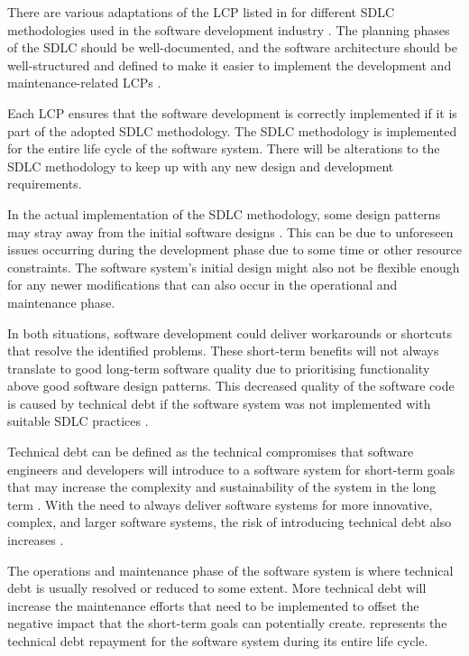 There are various adaptations of the LCP listed in  for different SDLC methodologies used in the software development industry \cite{Al-Saiyd2015}. The planning phases of the SDLC should be well-documented, and the software architecture should be well-structured and defined to make it easier to implement the development and maintenance-related LCPs \cite{Ackermann2009}.\par Each LCP ensures that the software development is correctly implemented if it is part of the adopted SDLC methodology. The SDLC methodology is implemented for the entire life cycle of the software system. There will be alterations to the SDLC methodology to keep up with any new design and development requirements.\par In the actual implementation of the SDLC methodology, some design patterns may stray away from the initial software designs \cite{Reimanis2016}. This can be due to unforeseen issues occurring during the development phase due to some time or other resource constraints. The software system's initial design might also not be flexible enough for any newer modifications that can also occur in the operational and maintenance phase.\par In both situations, software development could deliver workarounds or shortcuts that resolve the identified problems. These short-term benefits will not always translate to good long-term software quality due to prioritising functionality above good software design patterns. This decreased quality of the software code is caused by technical debt if the software system was not implemented with suitable SDLC practices \cite{DeLeon-Sigg2020, Reimanis2016}.\par Technical debt can be defined as the technical compromises that software engineers and developers will introduce to a software system for short-term goals that may increase the complexity and sustainability of the system in the long term \cite{Snipes2018, Gralha2018}. With the need to always deliver software systems for more innovative, complex, and larger software systems, the risk of introducing technical debt also increases \cite{Reimanis2016, Khan2013}.\par The operations and maintenance phase of the software system is where technical debt is usually resolved or reduced to some extent. More technical debt will increase the maintenance efforts that need to be implemented to offset the negative impact that the short-term goals can potentially create.  represents the technical debt repayment for the software system during its entire life cycle.

